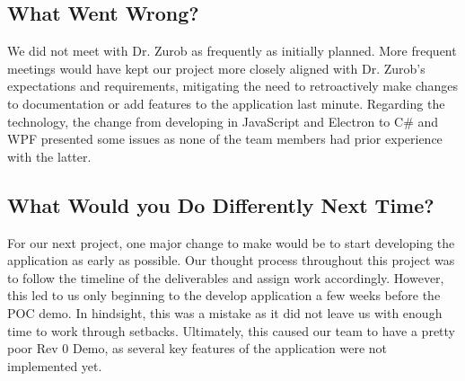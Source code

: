 \documentclass{article}
\begin{document}
\subsection{What Went Wrong?}


\noindent We did not meet with Dr. Zurob as frequently as initially planned. More frequent meetings would have kept our project more closely aligned with Dr. Zurob's expectations and requirements, mitigating the need to retroactively make changes to documentation or add features to the application last minute. Regarding the technology, the change from developing in JavaScript and Electron to C# and WPF presented some issues as none of the team members had prior experience with the latter. \\

\subsection{What Would you Do Differently Next Time?}


\noindent For our next project, one major change to make would be to start developing the application as early as possible. Our thought process throughout this project was to follow the timeline of the deliverables and assign work accordingly. However, this led to us only beginning to the develop application a few weeks before the POC demo. In hindsight, this was a mistake as it did not leave us with enough time to work through setbacks. Ultimately, this caused our team to have a pretty poor Rev 0 Demo, as several key features of the application were not implemented yet.
\end{document}
